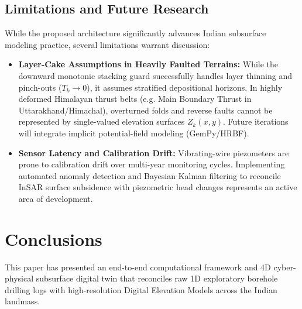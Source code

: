 \documentclass[11pt,a4paper]{article}
\begin{document}
\subsection{Limitations and Future Research}
While the proposed architecture significantly advances Indian subsurface modeling practice, several limitations warrant discussion:
\begin{itemize}
    \item \textbf{Layer-Cake Assumptions in Heavily Faulted Terrains:} While the downward monotonic stacking guard successfully handles layer thinning and pinch-outs ($T_k \to 0$), it assumes stratified depositional horizons. In highly deformed Himalayan thrust belts (e.g. Main Boundary Thrust in Uttarakhand/Himachal), overturned folds and reverse faults cannot be represented by single-valued elevation surfaces $Z_k(x, y)$. Future iterations will integrate implicit potential-field modeling (GemPy/HRBF).
    \item \textbf{Sensor Latency and Calibration Drift:} Vibrating-wire piezometers are prone to calibration drift over multi-year monitoring cycles. Implementing automated anomaly detection and Bayesian Kalman filtering to reconcile InSAR surface subsidence with piezometric head changes represents an active area of development.
\end{itemize}

\section{Conclusions}

This paper has presented an end-to-end computational framework and 4D cyber-physical subsurface digital twin that reconciles raw 1D exploratory borehole drilling logs with high-resolution Digital Elevation Models across the Indian landmass. 
\end{document}
